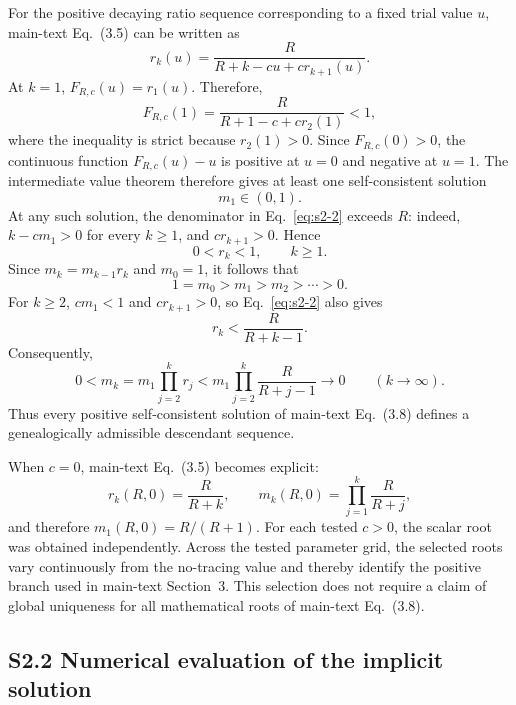\documentclass[11pt]{article}
\begin{document}
For the positive decaying ratio sequence corresponding to a fixed trial value $u$, main-text Eq.~(3.5) can be written as
\begin{equation}
r_k(u)=\frac{R}{R+k-cu+cr_{k+1}(u)}.
\label{eq:s2-2}
\end{equation}
At $k=1$, $F_{R,c}(u)=r_1(u)$. Therefore,
\begin{equation}
F_{R,c}(1)=\frac{R}{R+1-c+cr_2(1)}<1,
\end{equation}
where the inequality is strict because $r_2(1)>0$. Since $F_{R,c}(0)>0$, the continuous function $F_{R,c}(u)-u$ is positive at $u=0$ and negative at $u=1$. The intermediate value theorem therefore gives at least one self-consistent solution
\begin{equation}
m_1\in(0,1).
\end{equation}
At any such solution, the denominator in Eq.~\eqref{eq:s2-2} exceeds $R$: indeed, $k-cm_1>0$ for every $k\geq1$, and $cr_{k+1}>0$. Hence
\begin{equation}
0<r_k<1,\qquad k\geq1.
\end{equation}
Since $m_k=m_{k-1}r_k$ and $m_0=1$, it follows that
\begin{equation}
1=m_0>m_1>m_2>\cdots>0.
\end{equation}
For $k\geq2$, $cm_1<1$ and $cr_{k+1}>0$, so Eq.~\eqref{eq:s2-2} also gives
\begin{equation}
r_k<\frac{R}{R+k-1}.
\end{equation}
Consequently,
\begin{equation}
0<m_k=m_1\prod_{j=2}^{k}r_j<m_1\prod_{j=2}^{k}\frac{R}{R+j-1}\longrightarrow0\qquad(k\to\infty).
\end{equation}
Thus every positive self-consistent solution of main-text Eq.~(3.8) defines a genealogically admissible descendant sequence.

When $c=0$, main-text Eq.~(3.5) becomes explicit:
\begin{equation}
r_k(R,0)=\frac{R}{R+k},
\qquad
m_k(R,0)=\prod_{j=1}^{k}\frac{R}{R+j},
\label{eq:s2-9}
\end{equation}
and therefore $m_1(R,0)=R/(R+1)$. For each tested $c>0$, the scalar root was obtained independently. Across the tested parameter grid, the selected roots vary continuously from the no-tracing value and thereby identify the positive branch used in main-text Section~3. This selection does not require a claim of global uniqueness for all mathematical roots of main-text Eq.~(3.8).

\subsection*{S2.2 Numerical evaluation of the implicit solution}
\end{document}
